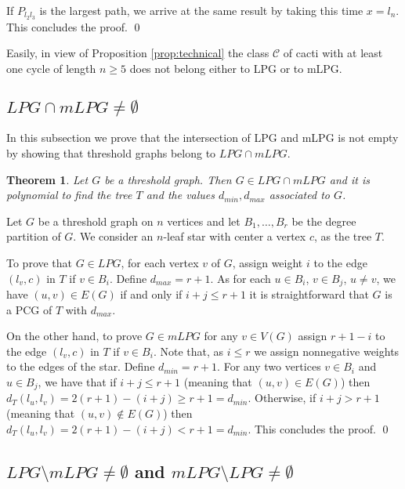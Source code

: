 \documentclass[dvipdfm]{llncs}
\newtheorem{Theorem}{Theorem}
\newcommand{\dmin}{d_{min}}
\newcommand{\dmax}{d_{max}}
\begin{document}
If $P_{l_2l_3}$ is the largest path, we arrive at the same result  by taking this time $x=l_n$. This concludes the proof. \qed

Easily, in view of Proposition \ref{prop:technical} the class $\mathcal{C}$ of cacti with at least one cycle of length $n \geq 5$ does not belong either to LPG or to mLPG. 

\subsection{$LPG \cap mLPG \neq \emptyset$}\label{subsec:intersection}

In this subsection we prove that the intersection of LPG and mLPG is not empty by showing that threshold graphs belong to $LPG  \cap mLPG$. 

\begin{Theorem}\label{theo:threshold}
Let $G$ be a threshold graph. Then $G \in LPG  \cap mLPG$ and it is polynomial to find the tree $T$ and the values $\dmin, \dmax$ associated to $G$.
\end{Theorem}

\proof
Let $G$ be a threshold graph on $n$ vertices and let $B_1, \ldots, B_r$ be the degree partition of $G$.  We consider an $n$-leaf star with center a vertex $c$, as the tree $T$. 

To prove that $G \in LPG$, for each vertex $v$ of $G$, assign weight  $i$ to the edge $(l_v,c)$ in $T$ if $v \in B_i$. Define $\dmax=r+1$.  As for each $u \in B_i$, $v \in B_j$, $u \neq v$, we have $(u,v) \in E(G)$ if and only if $i+j \leq r+1$ it is straightforward that $G$ is a PCG of $T$ with $\dmax$. 


On the other hand, to prove $G \in mLPG$ for any $v \in V(G)$ assign $r+1-i$ to the edge $(l_v,c)$ in $T$ if $v \in B_i$.  Note that, as $i \leq r$ we assign nonnegative weights to the edges of the star. Define $\dmin=r+1$. For any two vertices $v \in B_i$ and $u \in B_j$, we have that if $i + j \leq r+1$ (meaning that $(u,v) \in E(G)$) then $d_T(l_u,l_v)=2(r+1)-(i+j) \geq r+1=\dmin$. Otherwise, if $i + j > r+1$ (meaning that $(u,v) \not\in E(G)$) then $d_T(l_u,l_v)=2(r+1)-(i+j) < r+1=\dmin$. This concludes the proof. \qed


\subsection{$LPG \setminus mLPG \neq \emptyset$ and $mLPG \setminus LPG \neq \emptyset$}\label{subsec:proper}
\end{document}
